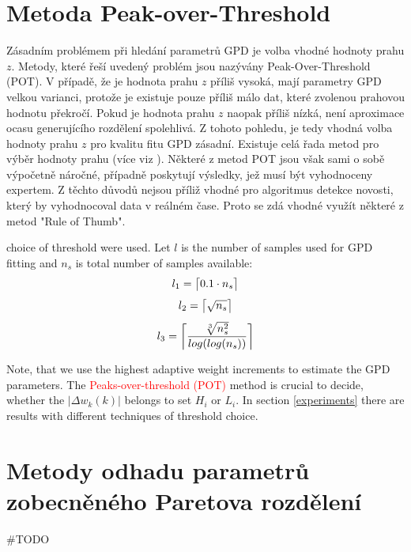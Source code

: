 \section{Metoda Peak-over-Threshold}
Zásadním problémem při hledání parametrů GPD je volba vhodné hodnoty prahu $z$. Metody, které řeší uvedený problém jsou nazývány Peak-Over-Threshold (POT). V případě, že je hodnota prahu $z$ příliš vysoká, mají parametry GPD velkou varianci, protože je existuje pouze příliš málo dat, které zvolenou prahovou hodnotu překročí. Pokud je hodnota prahu $z$ naopak příliš nízká, není aproximace ocasu generujícího rozdělení spolehlivá.  Z tohoto pohledu, je tedy vhodná volba hodnoty prahu $z$ pro kvalitu fitu GPD zásadní. Existuje celá řada metod pro výběr hodnoty prahu (více viz \cite{scarrott2012review}). Některé z metod POT jsou však sami o sobě výpočetně náročné, případně poskytují výsledky, jež musí být vyhodnoceny expertem. Z těchto důvodů nejsou příliž vhodné pro algoritmus detekce novosti, který by vyhodnocoval data v reálném čase. Proto se zdá vhodné využít některé z metod "Rule of Thumb".

 \cite{dumouchel1983estimating,ferreira2003optimising,loretan1994testing} choice of threshold were used. Let $l$ is the number of samples used for GPD fitting and $n_s$ is total number of samples available:
\begin{equation} \label{eq:l1}
    l_1=\ceil[\big]{0.1 \cdot n_s}
\end{equation}
\begin{equation} \label{eq:l2}
    l_2=\ceil[\big]{\sqrt{n_s}}
\end{equation}
\begin{equation} \label{eq:l3}
     l_3=\ceil[\bigg]{\frac{\sqrt[3]{n_s^{2}}}{log(log(n_s))}}
\end{equation}

Note, that we use the highest adaptive weight increments to estimate the GPD parameters. The \textcolor{red}{Peaks-over-threshold (POT)} method is crucial to decide, whether the $|\Delta w_k(k)|$ belongs to set $H_i$ or $L_i$. In section \ref{experiments} there are results with different techniques of threshold choice.

\section{Metody odhadu parametrů zobecněného Paretova rozdělení}
\#TODO